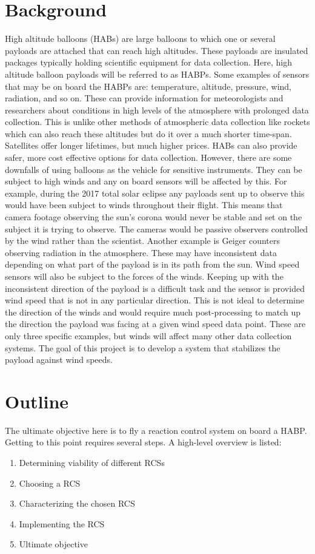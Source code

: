 \section{Background}
High altitude balloons (HABs) are large balloons to which one or several payloads are attached that can reach high altitudes. These payloads are insulated packages typically holding scientific equipment for data collection. Here, high altitude balloon payloads will be referred to as HABPs. Some examples of sensors that may be on board the HABPs are: temperature, altitude, pressure, wind, radiation, and so on. These can provide information for meteorologists and researchers about conditions in high levels of the atmosphere with prolonged data collection. This is unlike other methods of atmospheric data collection like rockets which can also reach these altitudes but do it over a much shorter time-span. Satellites offer longer lifetimes, but much higher prices. HABs can also provide safer, more cost effective options for data collection. However, there are some downfalls of using balloons as the vehicle for sensitive instruments. They can be subject to high winds and any on board sensors will be affected by this. For example, during the 2017 total solar eclipse any payloads sent up to observe this would have been subject to winds throughout their flight. This means that camera footage observing the sun's corona would never be stable and set on the subject it is trying to observe. The cameras would be passive observers controlled by the wind rather than the scientist. Another example is Geiger counters observing radiation in the atmosphere. These may have inconsistent data depending on what part of the payload is in its path from the sun. Wind speed sensors will also be subject to the forces of the winds. Keeping up with the inconsistent direction of the payload is a difficult task and the sensor is provided wind speed that is not in any particular direction. This is not ideal to determine the direction of the winds and would require much post-processing to match up the direction the payload was facing at a given wind speed data point. These are only three specific examples, but winds will affect many other data collection systems. The goal of this project is to develop a system that stabilizes the payload against wind speeds. 
\section{Outline}
The ultimate objective here is to fly a reaction control system on board a HABP. Getting to this point requires several steps. A high-level overview is listed:
\begin{enumerate}
\item Determining viability of different RCSs
\item Choosing a RCS
\item Characterizing the chosen RCS
\item Implementing the RCS
\item Ultimate objective
\end{enumerate}
